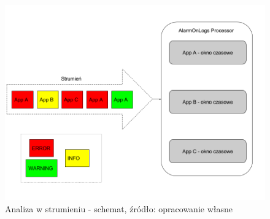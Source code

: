     \begin{figure}[H]
        \centering
        \includegraphics[width=1.0\textwidth]{images/aol_stream}
        \caption[Analiza w strumieniu - schemat]{
            Analiza w strumieniu - schemat, 
            źródło: opracowanie własne
        }
        \label{chapter:application_own:plans:alarm_on_logs:streaming:diagram}
    \end{figure}
    

